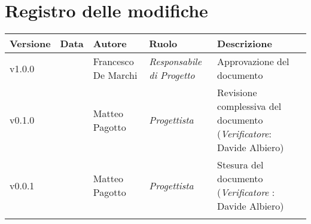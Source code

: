 \section*{\hfil Registro delle modifiche \hfil}
{
	\newlength{\freewidth}
	\setlength{\freewidth}{\dimexpr\textwidth-10\tabcolsep}
	\renewcommand{\arraystretch}{1.5}
	\centering
	\setlength{\aboverulesep}{0pt}
	\setlength{\belowrulesep}{0pt}
	\begin{longtable}{C{.131777\freewidth} C{.134036\freewidth} C{.263554\freewidth} C{.188254\freewidth} C{.282379\freewidth}}
		\toprule 
		\textbf{Versione} & \textbf{Data} & \textbf{Autore} & \textbf{Ruolo} & \textbf{Descrizione}\\
		\toprule
		\endhead
		
		v1.0.0 & \DataDoc{} &Francesco De Marchi & \textit{Responsabile di Progetto} & Approvazione del documento \\  
		v0.1.0 & \DataDoc{} & Matteo Pagotto & \textit{Progettista} & Revisione complessiva del documento (\textit{Verificatore}: Davide Albiero) \\ 
		v0.0.1 & \DataDoc{} & Matteo Pagotto &  \textit{Progettista} & Stesura del documento (\textit{Verificatore} : Davide Albiero) \\
		
		
		\bottomrule
		\hiderowcolors
	\end{longtable}
}

